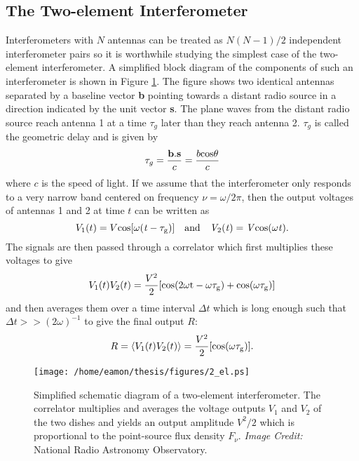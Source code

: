 \subsection{The Two-element Interferometer}\label{subsec:5}
Interferometers with $N$ antennas can be treated as $N(N-1)/2$ independent interferometer pairs so it is worthwhile studying the simplest case of the two-element interferometer. A simplified block diagram of the components of such an interferometer is shown in Figure \ref{fig2.6}. The figure shows two identical antennas separated by a baseline vector \textbf{b} pointing towards a distant radio source in a direction indicated by the unit vector \textbf{s}. The plane waves from the distant radio source reach antenna 1 at a time $\tau _g$ later than they reach antenna 2. $\tau _g$ is called the geometric delay and is given by
\begin{equation}
\tau _{g}=\frac{\textbf{b}.\textbf{s}}{c}=\frac{b\rm{cos}\theta}{c}
\end{equation}
where $c$ is the speed of light. If we assume that the interferometer only responds to a very narrow band centered on frequency $\nu=\omega /2\pi$, then the output voltages of antennas 1 and 2 at time $t$ can be written as 
\begin{equation}
V_1(t)=V\rm{cos}[\omega(\mathit{t}-\tau _g)] \ \ \ \rm{and} \ \ \ \mathit{V_{\rm{2}}(t)=V\rm{cos}(\omega \mathit{t})}.
\end{equation}
The signals are then passed through a correlator which first multiplies these voltages to give
\begin{equation}
V_1(t) V_2(t)=\frac{V^2}{2}[\rm{cos(2\omega t -\omega \tau _g)+\rm{cos}(\omega \tau _g)}]
\end{equation}
and then averages them over a time interval $\Delta t$ which is long enough such that $\Delta t >> (2\omega)^{-1}$ to give the final output $R$:
\begin{equation}
R=\langle V_1(t)V_2(t)\rangle = \frac{V^2}{2}[\rm{cos}(\omega \tau _g)].
\end{equation}

\begin{figure}[hbt!]
\centering 
          \texttt{[image: /home/eamon/thesis/figures/2\_el.ps]}
\caption[Simplified schematic diagram of a two-element interferometer.]{Simplified schematic diagram of a two-element interferometer. The correlator multiplies and averages the voltage outputs $V_1$ and $V_2$ of the two dishes and yields an output amplitude $V^2/2$ which is proportional to the point-source flux density $F_{\nu}$. \textit{Image Credit:} National Radio Astronomy Observatory.}
\label{fig2.6}
\end{figure}


